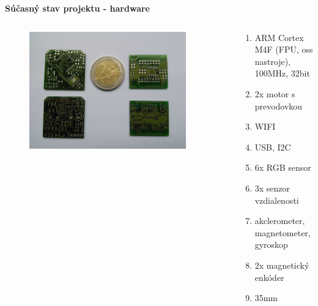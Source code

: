 \documentclass[xcolor=dvipsnames]{beamer}
\begin{document}
\begin{frame}{\bf Súčasný stav projektu - hardware}

\begin{columns}
	\begin{column}{0.48\textwidth}

	\begin{figure}[ht]
	\begin{center}
	\begin{minipage}{0.9\linewidth}
	\begin{center}
	\includegraphics[width=0.9\textwidth]{images/board.jpg}
	\end{center}
	\end{minipage}
	\end{center}
	\end{figure}

	\end{column}
	\begin{column}{0.48\textwidth}
		\begin{enumerate}
            \item ARM Cortex M4F (FPU, oss nastroje), 100MHz, 32bit
            \item 2x motor s prevodovkou
            \item WIFI
            \item USB, I2C
            \item 6x RGB sensor
			\item 3x senzor vzdialenosti
            \item akclerometer, magnetometer, gyroskop
            \item 2x magnetický enkóder
            \item 35mm
		\end{enumerate}
	\end{column}
\end{columns}

\end{frame}
\end{document}

